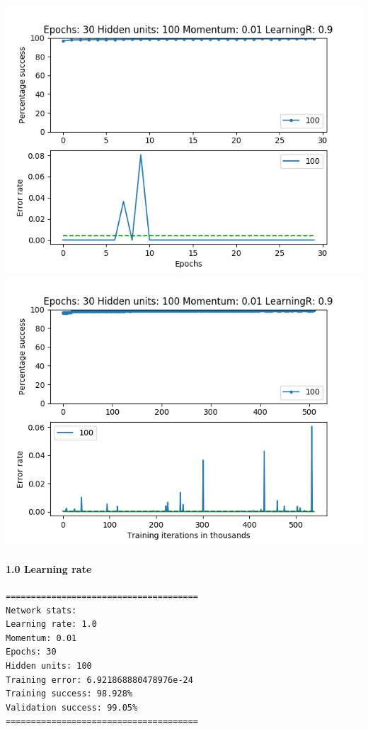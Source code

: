 \documentclass[11pt]{article}
\makeatletter
\def\maxwidth{\ifdim\Gin@nat@width>\linewidth\linewidth
    \else\Gin@nat@width\fi}
\let\Oldincludegraphics\includegraphics
\renewcommand{\includegraphics}[1]{\Oldincludegraphics[width=.8\maxwidth]{#1}}
\makeatother
\begin{document}
\includegraphics{Experiment1/E1_NN_Epoch_Momentum_0.01_30Epochs_100_LR_0.9_Hiddenunits.png}
\includegraphics{Experiment1/E1_NN_Training_Momentum_0.01_30Epochs_100_LR_0.9_Hiddenunits.png}

\hypertarget{learning-rate-9}{%
\paragraph{1.0 Learning rate}\label{learning-rate-9}}

\begin{verbatim}
======================================
Network stats: 
Learning rate: 1.0
Momentum: 0.01
Epochs: 30
Hidden units: 100
Training error: 6.921868880478976e-24
Training success: 98.928%
Validation success: 99.05%
======================================
\end{verbatim}
\end{document}
